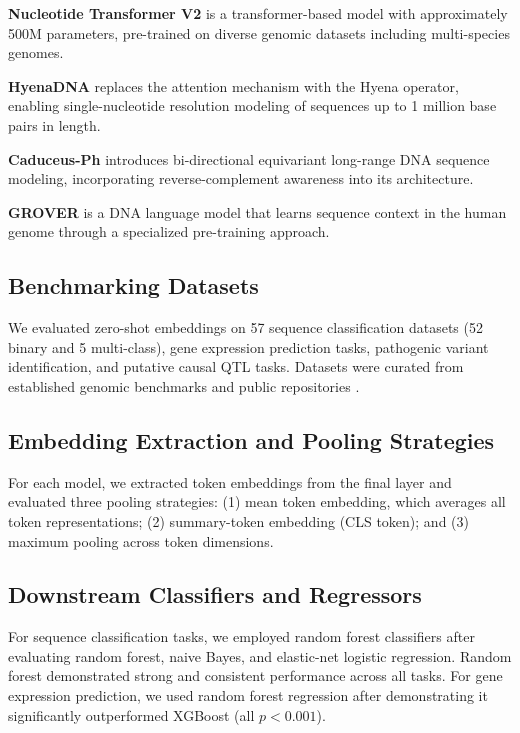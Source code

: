 \documentclass{article}
\begin{document}
\textbf{Nucleotide Transformer V2} \citep{dallago2025nucleotide} is a transformer-based model with approximately 500M parameters, pre-trained on diverse genomic datasets including multi-species genomes.

\textbf{HyenaDNA} \citep{nguyen2023hyenadna} replaces the attention mechanism with the Hyena operator, enabling single-nucleotide resolution modeling of sequences up to 1 million base pairs in length.

\textbf{Caduceus-Ph} \citep{schiff2024caduceus} introduces bi-directional equivariant long-range DNA sequence modeling, incorporating reverse-complement awareness into its architecture.

\textbf{GROVER} \citep{sanabria2024grover} is a DNA language model that learns sequence context in the human genome through a specialized pre-training approach.

\subsection{Benchmarking Datasets}

We evaluated zero-shot embeddings on 57 sequence classification datasets (52 binary and 5 multi-class), gene expression prediction tasks, pathogenic variant identification, and putative causal QTL tasks. Datasets were curated from established genomic benchmarks and public repositories \citep{gresova2023genomic}.

\subsection{Embedding Extraction and Pooling Strategies}

For each model, we extracted token embeddings from the final layer and evaluated three pooling strategies: (1) mean token embedding, which averages all token representations; (2) summary-token embedding (CLS token); and (3) maximum pooling across token dimensions.

\subsection{Downstream Classifiers and Regressors}

For sequence classification tasks, we employed random forest classifiers after evaluating random forest, naive Bayes, and elastic-net logistic regression. Random forest demonstrated strong and consistent performance across all tasks. For gene expression prediction, we used random forest regression after demonstrating it significantly outperformed XGBoost (all $p < 0.001$).
\end{document}
